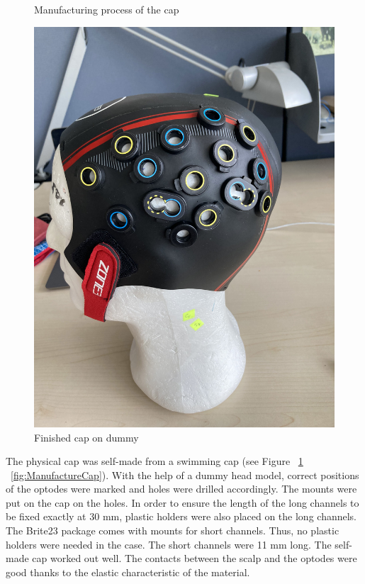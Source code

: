 \begin{figure}[H]
\begin{minipage}[c]{.4\linewidth}
  \caption{Manufacturing process of the cap}
  \label{fig:ManufactureCap}
\end{minipage} \hfill
\begin{minipage}[c]{.4\linewidth}
  \centering
  \includegraphics[scale= 0.06, angle= -90, origin= c] {bilder/IMG_9768.jpg}
  \caption{Finished cap on dummy}
  \label{fig:FinishedCap}
\end{minipage}
\end{figure}

The physical cap was self-made from a swimming cap (see Figure ~\ref {fig:FinishedCap} ~\ref {fig:ManufactureCap}). With the help of a dummy head model, correct positions of the optodes were marked and holes were drilled accordingly. The mounts were put on the cap on the holes. In order to ensure the length of the long channels to be fixed exactly at 30 mm, plastic holders were also placed on the long channels. The Brite23 package comes with mounts for short channels. Thus, no plastic holders were needed in the case. The short channels were 11 mm long. The self-made cap worked out well. The contacts between the scalp and the optodes were good thanks to the elastic characteristic of the material.




